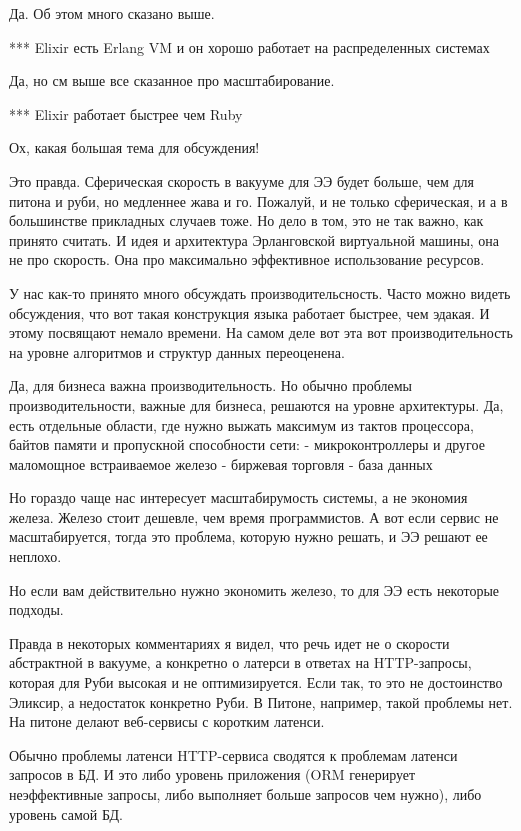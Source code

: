\documentclass[10pt]{beamer}
\begin{document}
Да. Об этом много сказано выше.


*** Elixir есть Erlang VM и он хорошо работает на распределенных системах

Да, но см выше все сказанное про масштабирование.


*** Elixir работает быстрее чем Ruby

Ох, какая большая тема для обсуждения!

Это правда. Сферическая скорость в вакууме для ЭЭ будет больше, чем для питона и руби, но медленнее жава и го.
Пожалуй, и не только сферическая, и а в большинстве прикладных случаев тоже.
Но дело в том, это не так важно, как принято считать.
И идея и архитектура Эрланговской виртуальной машины, она не про скорость. Она про максимально эффективное использование ресурсов.

У нас как-то принято много обсуждать производительсность.
Часто можно видеть обсуждения, что вот такая конструкция языка работает быстрее, чем эдакая. И этому посвящают немало времени.
На самом деле вот эта вот производительность на уровне алгоритмов и структур данных переоценена.

Да, для бизнеса важна производительность. Но обычно проблемы производительности, важные для бизнеса, решаются на уровне архитектуры.
Да, есть отдельные области, где нужно выжать максимум из тактов процессора, байтов памяти и пропускной способности сети:
- микроконтроллеры и другое маломощное встраиваемое железо
- биржевая торговля
- база данных

Но гораздо чаще нас интересует масштабирумость системы, а не экономия железа.
Железо стоит дешевле, чем время программистов. А вот если сервис не масштабируется, тогда это проблема, которую нужно решать, и ЭЭ решают ее неплохо.

Но если вам действительно нужно экономить железо, то для ЭЭ есть некоторые подходы.

Правда в некоторых комментариях я видел, что речь идет не о скорости абстрактной в вакууме,
а конкретно о латерси в ответах на HTTP-запросы, которая для Руби высокая и не оптимизируется.
Если так, то это не достоинство Эликсир, а недостаток конкретно Руби.
В Питоне, например, такой проблемы нет. На питоне делают веб-сервисы с коротким латенси.

Обычно проблемы латенси HTTP-сервиса сводятся к проблемам латенси запросов в БД.
И это либо уровень приложения (ORM генерирует неэффективные запросы, либо выполняет больше запросов чем нужно),
либо уровень самой БД.
\end{document}
